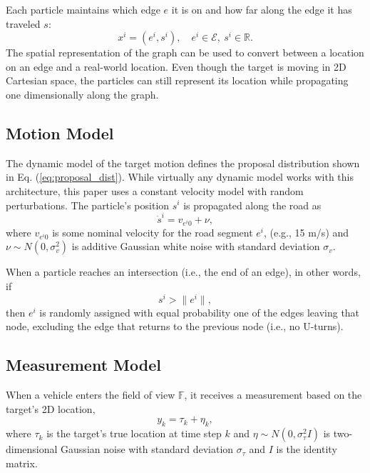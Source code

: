 \documentclass[letterpaper, 10 pt, conference]{ieeeconf}  %
\begin{document}
Each particle maintains which edge $e$ it is on and how far along the edge it has traveled $s$:
\begin{equation}%
    x^i = (e^i, s^i), \quad e^i \in \mathcal{E},\ s^i \in \mathbb{R}.
\end{equation}
The spatial representation of the graph can be used to convert between a location on an edge and a real-world location. Even though the target is moving in 2D Cartesian space, the particles can still represent its location while propagating one dimensionally along the graph.

\subsection{Motion Model}

The dynamic model of the target motion defines the proposal distribution shown in Eq. (\ref{eq:proposal_dist}). While virtually any dynamic model works with this architecture, this paper uses a constant velocity model with random perturbations. The particle's position $s^i$ is propagated along the road as
\begin{equation}%
    \dot{s}^i = v_{e^{i}0} + \nu,
\end{equation}
where $v_{e^{i}0}$ is some nominal velocity for the road segment $e^i$, (e.g., 15 m/s) and $\nu \sim N(0, \sigma_v^2)$ is additive Gaussian white noise with standard deviation $\sigma_v$.

When a particle reaches an intersection (i.e., the end of an edge), in other words, if
\begin{equation}%
    s^i > \lVert e^i \rVert,
\end{equation}
then $e^i$ is randomly assigned with equal probability one of the edges leaving that node, excluding the edge that returns to the previous node (i.e., no U-turns).

\subsection{Measurement Model}

When a vehicle enters the field of view $\mathbb{F}$, it receives a measurement based on the target's 2D location,
\begin{equation}%
    y_k = \tau_k + \eta_k,
\end{equation}
where $\tau_k$ is the target's true location at time step $k$ and $\eta \sim N(0, \sigma_\tau^2 I)$ is two-dimensional Gaussian noise with standard deviation $\sigma_\tau$ and $I$ is the identity matrix.
\end{document}

